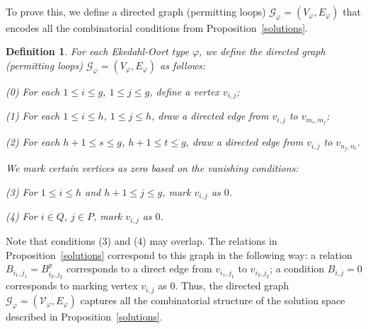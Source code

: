 \documentclass[a4paper,12pt,twoside]{report}
\newtheorem{definition}[theorem]{Definition}
\begin{document}
To prove this, we define a directed graph (permitting loops) $\mathcal{G}_{\varphi}=(V_{\varphi},E_{\varphi})$ 
that encodes all the combinatorial conditions from Proposition~\ref{solutions}.

\begin{definition}\label{GGphi}
    For each Ekedahl-Oort type $\varphi$, we define the directed graph (permitting loops) $\mathcal{G}_{\varphi}=(V_{\varphi},E_{\varphi})$ as follows: 

    {\rm(0)} For each $1\leqslant i\leqslant g$, $1\leqslant j\leqslant g$, define a vertex $v_{i,j}$; 

    {\rm(1)} For each $1\leqslant i\leqslant h$, $1\leqslant j\leqslant h$, draw a directed edge from $v_{i,j}$ to $v_{m_i,m_j}$; 

    {\rm(2)} For each $h+1\leqslant s\leqslant g$, $h+1\leqslant t\leqslant g$, draw a directed edge from $v_{i,j}$ to $v_{n_j,n_i}$. 

    We mark certain vertices as zero based on the vanishing conditions:  

    {\rm(3)} For $1\leqslant i\leqslant h$ and $h+1\leqslant j \leqslant g$, mark $v_{i,j}$ as $0$. 
    
    {\rm(4)} For $i\in Q$, $j\in P$, mark $v_{i,j}$ as $0$. 
\end{definition}

Note that conditions (3) and (4) may overlap. 
The relations in Proposition~\ref{solutions} correspond to this graph in the following way: 
a relation $B_{i_1,j_1}=B_{i_2,j_2}^p$ corresponds to a direct edge from $v_{i_1,j_1}$ to $v_{i_2,j_2}$; 
a condition $B_{i,j}=0$ corresponds to marking vertex $v_{i,j}$ as $0$. 
Thus, the directed graph $\mathcal{G}_{\varphi}=(\mathcal{V}_{\varphi}, E_{\varphi})$ captures all the combinatorial structure of the solution space described in Proposition~\ref{solutions}.
\end{document}
